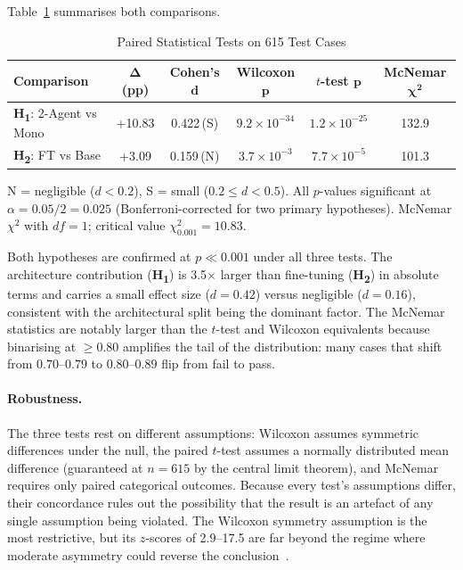 \medskip
Table~\ref{tab:stat-tests} summarises both comparisons.

\begin{table}[H]
    \centering
    \caption{Paired Statistical Tests on 615 Test Cases}
    \label{tab:stat-tests}
    \begin{tabular}{|l|c|c|c|c|c|}
        \hline
        \textbf{Comparison} & $\boldsymbol{\Delta}$ \textbf{(pp)} & \textbf{Cohen's} $\boldsymbol{d}$ & \textbf{Wilcoxon} $\boldsymbol{p}$ & \textbf{$t$-test} $\boldsymbol{p}$ & \textbf{McNemar} $\boldsymbol{\chi^{2}}$ \\
        \hline
        \textbf{H\textsubscript{1}}: 2-Agent vs Mono & +10.83 & 0.422\,(S) & $9.2\!\times\!10^{-34}$ & $1.2\!\times\!10^{-25}$ & 132.9 \\
        \textbf{H\textsubscript{2}}: FT vs Base & +3.09  & 0.159\,(N) & $3.7\!\times\!10^{-3}$  & $7.7\!\times\!10^{-5}$  & 101.3 \\
        \hline
    \end{tabular}
    \par\smallskip
    \footnotesize N = negligible ($d < 0.2$), S = small ($0.2 \leq d < 0.5$). All $p$-values significant at $\alpha = 0.05/2 = 0.025$ (Bonferroni-corrected for two primary hypotheses). McNemar $\chi^2$ with $df = 1$; critical value $\chi^{2}_{0.001} = 10.83$.
\end{table}

Both hypotheses are confirmed at $p \ll 0.001$ under all three tests. The architecture contribution (\textbf{H\textsubscript{1}}) is 3.5$\times$ larger than fine-tuning (\textbf{H\textsubscript{2}}) in absolute terms and carries a small effect size ($d = 0.42$) versus negligible ($d = 0.16$), consistent with the architectural split being the dominant factor. The McNemar statistics are notably larger than the $t$-test and Wilcoxon equivalents because binarising at $\geq 0.80$ amplifies the tail of the distribution: many cases that shift from $0.70$--$0.79$ to $0.80$--$0.89$ flip from fail to pass.

\paragraph{Robustness.}
The three tests rest on different assumptions: Wilcoxon assumes symmetric differences under the null, the paired $t$-test assumes a normally distributed mean difference (guaranteed at $n = 615$ by the central limit theorem), and McNemar requires only paired categorical outcomes. Because every test's assumptions differ, their concordance rules out the possibility that the result is an artefact of any single assumption being violated. The Wilcoxon symmetry assumption is the most restrictive, but its $z$-scores of 2.9--17.5 are far beyond the regime where moderate asymmetry could reverse the conclusion~\cite{wilcoxon1945individual}.

